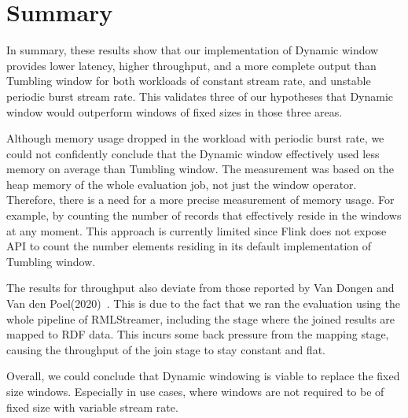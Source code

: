 \begin{table}[htbp]
    \centering
\caption{Tumbling window's completeness measurement. 
    The \emph{Expected (triples)} are the number of triples generated by the 
bounded data processing RMLStreamer.}
\label{tab:tumbling_completeness}
\end{table}


\section{Summary}%
\label{sec:Result Summary}

In summary, these results show that our implementation of Dynamic window 
provides lower latency, higher throughput, and a more complete 
output than Tumbling window for both 
workloads of constant stream rate, and unstable periodic burst stream rate.
This validates three of our hypotheses that Dynamic window would outperform 
windows of fixed sizes in those three areas. 

Although memory usage dropped in the workload with periodic burst rate, we 
could not confidently conclude that the Dynamic window effectively used less memory
on average than Tumbling window. The measurement was based on the heap memory of the 
whole evaluation job, not just the window operator. Therefore, there is a need for a 
more precise measurement of memory usage. For example, by counting the number of 
records that effectively reside in the windows at any moment. This approach is currently 
limited since Flink does not expose API to count the number elements residing 
in its default implementation of Tumbling window.  

The results for throughput also deviate from those reported by Van Dongen and Van den Poel(2020)~\cite{evalution_of_spe}. 
This is due to the fact that we ran the evaluation using the whole pipeline of RMLStreamer, including 
the stage where the joined results are mapped to RDF data. This incurs some back pressure from the mapping stage, 
causing the throughput of the join stage to stay constant and flat.    

Overall, we could conclude that Dynamic windowing is viable to replace the fixed size windows. Especially in use 
cases, where windows are not required to be of fixed size with variable stream rate.  

